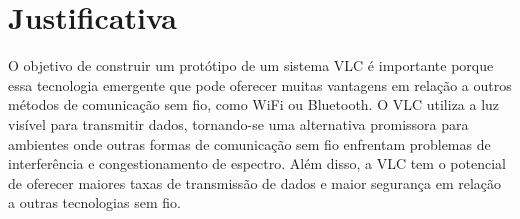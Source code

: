 \chapter{Justificativa}

O objetivo de construir um protótipo de um sistema VLC é importante porque essa tecnologia emergente que pode oferecer muitas vantagens em relação a outros métodos de comunicação sem fio, como WiFi ou Bluetooth. O VLC utiliza a luz visível para transmitir dados, tornando-se uma alternativa promissora para ambientes onde outras formas de comunicação sem fio enfrentam problemas de interferência e congestionamento de espectro. Além disso, a VLC tem o potencial de oferecer maiores taxas de transmissão de dados e maior segurança em relação a outras tecnologias sem fio.

